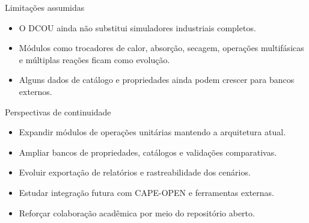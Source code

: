 \begin{frame}{Limitações assumidas}
  \begin{itemize}
    \item O DCOU ainda não substitui simuladores industriais completos.
    \item Módulos como trocadores de calor, absorção, secagem, operações multifásicas e múltiplas reações ficam como evolução.
    \item Alguns dados de catálogo e propriedades ainda podem crescer para bancos externos.
  \end{itemize}
\end{frame}

\begin{frame}{Perspectivas de continuidade}
  \begin{itemize}
    \item Expandir módulos de operações unitárias mantendo a arquitetura atual.
    \item Ampliar bancos de propriedades, catálogos e validações comparativas.
    \item Evoluir exportação de relatórios e rastreabilidade dos cenários.
    \item Estudar integração futura com CAPE-OPEN e ferramentas externas.
    \item Reforçar colaboração acadêmica por meio do repositório aberto.
  \end{itemize}
\end{frame}
